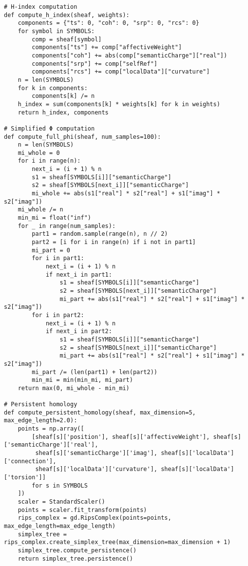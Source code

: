 \documentclass{article}
\begin{document}
\begin{lstlisting}
# H-index computation
def compute_h_index(sheaf, weights):
    components = {"ts": 0, "coh": 0, "srp": 0, "rcs": 0}
    for symbol in SYMBOLS:
        comp = sheaf[symbol]
        components["ts"] += comp["affectiveWeight"]
        components["coh"] += abs(comp["semanticCharge"]["real"])
        components["srp"] += comp["selfRef"]
        components["rcs"] += comp["localData"]["curvature"]
    n = len(SYMBOLS)
    for k in components:
        components[k] /= n
    h_index = sum(components[k] * weights[k] for k in weights)
    return h_index, components

# Simplified Φ computation
def compute_full_phi(sheaf, num_samples=100):
    n = len(SYMBOLS)
    mi_whole = 0
    for i in range(n):
        next_i = (i + 1) % n
        s1 = sheaf[SYMBOLS[i]]["semanticCharge"]
        s2 = sheaf[SYMBOLS[next_i]]["semanticCharge"]
        mi_whole += abs(s1["real"] * s2["real"] + s1["imag"] * s2["imag"])
    mi_whole /= n
    min_mi = float("inf")
    for _ in range(num_samples):
        part1 = random.sample(range(n), n // 2)
        part2 = [i for i in range(n) if i not in part1]
        mi_part = 0
        for i in part1:
            next_i = (i + 1) % n
            if next_i in part1:
                s1 = sheaf[SYMBOLS[i]]["semanticCharge"]
                s2 = sheaf[SYMBOLS[next_i]]["semanticCharge"]
                mi_part += abs(s1["real"] * s2["real"] + s1["imag"] * s2["imag"])
        for i in part2:
            next_i = (i + 1) % n
            if next_i in part2:
                s1 = sheaf[SYMBOLS[i]]["semanticCharge"]
                s2 = sheaf[SYMBOLS[next_i]]["semanticCharge"]
                mi_part += abs(s1["real"] * s2["real"] + s1["imag"] * s2["imag"])
        mi_part /= (len(part1) + len(part2))
        min_mi = min(min_mi, mi_part)
    return max(0, mi_whole - min_mi)

# Persistent homology
def compute_persistent_homology(sheaf, max_dimension=5, max_edge_length=2.0):
    points = np.array([
        [sheaf[s]['position'], sheaf[s]['affectiveWeight'], sheaf[s]['semanticCharge']['real'],
         sheaf[s]['semanticCharge']['imag'], sheaf[s]['localData']['connection'],
         sheaf[s]['localData']['curvature'], sheaf[s]['localData']['torsion']]
        for s in SYMBOLS
    ])
    scaler = StandardScaler()
    points = scaler.fit_transform(points)
    rips_complex = gd.RipsComplex(points=points, max_edge_length=max_edge_length)
    simplex_tree = rips_complex.create_simplex_tree(max_dimension=max_dimension + 1)
    simplex_tree.compute_persistence()
    return simplex_tree.persistence()


\end{lstlisting}
\end{document}

